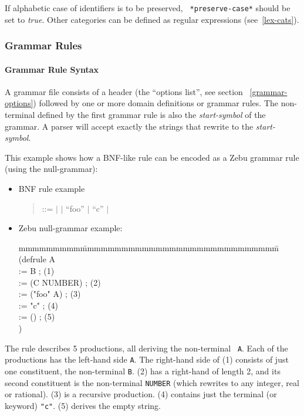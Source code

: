 If alphabetic case of identifiers is to be preserved, {\tt
*preserve-case*} should be set to {\em true}.  Other
categories can be defined as regular expressions (see~\ref{lex-cats}). 

\subsubsection{Grammar Rules}

\paragraph{Grammar Rule Syntax}

A grammar file consists of a header (the ``options list'', see section
~\ref{grammar-options}) followed by one or more domain definitions or
grammar rules.  The non-terminal defined by the first grammar rule is
also the {\em start-symbol} \/ of the grammar.  A parser will accept
exactly the strings that rewrite to the {\em start-symbol}.

This example shows how a BNF-like rule can be encoded as a {\sf Zebu}
grammar rule (using the null-grammar):

\begin{itemize}
  \item BNF rule example
        \begin{quote}
           ::=  $|$  
          $|$ ``foo''  $|$ ``c'' $|$  
        \end{quote}

  \item {\sf Zebu} null-grammar example:
        {\tt \begin{tabbing}
mmmmmmmmm\=mmmmmmmmmmmmmmmmmmmmmmmmmmmmm\=\kill
        (defrule \>A                            \\
         \> := B                        \>; (1)\\
         \> := (C NUMBER)               \>; (2)\\
         \> := ("foo" A)                \>; (3)\\
         \> := "c"                      \>; (4)\\
         \> := ()                       \>; (5)\\
         \>)
\end{tabbing}}
\end{itemize}


The rule describes 5 productions, all deriving the non-terminal {\tt
A}.  Each of the productions has the left-hand side {\tt A}. The
right-hand side of (1) consists of just one constituent, the
non-terminal {\tt B}. (2) has a right-hand of length 2, and its second
constituent is the non-terminal {\tt NUMBER} (which rewrites to any
integer, real or rational). (3) is a recursive production.  (4)
contains just the terminal (or keyword) {\tt "c"}. (5) derives the
empty string.

